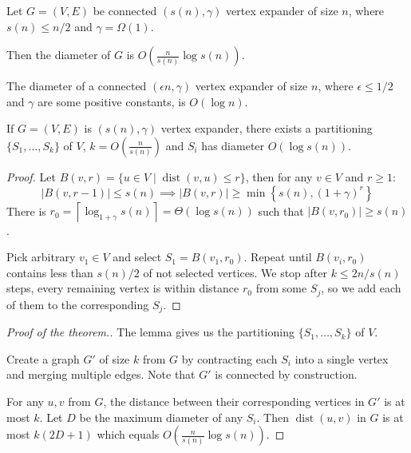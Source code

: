 \documentclass{beamer}
\newcommand{\ceil}[1]{{\left\lceil{#1}\right\rceil}}
\DeclareMathOperator*{\dist}{dist}
\newcommand{\autotitle}{\secname\ifdefempty{\subsecname}{}{~--- \subsecname}}
\newcommand{\smalldisplayskips}{
    \setlength{\abovedisplayskip}{3pt}
    \setlength{\belowdisplayskip}{3pt}}
\begin{document}
\begin{frame}{\autotitle}
    \begin{theorem}
        Let $G=(V,E)$ be connected $(s(n),\gamma)$ vertex expander of size $n$,
        where $s(n)\leq n/2$ and $\gamma=\Omega(1)$.
        
        Then the diameter of $G$ is $O\left(\frac{n}{s(n)}\log s(n)\right)$.
    \end{theorem}
    \begin{corollary}
        The diameter of a connected $(\epsilon n,\gamma)$ vertex expander of size $n$,
        where $\epsilon\leq1/2$ and $\gamma$ are some positive constants, is $O(\log n)$.
    \end{corollary}
\end{frame}

\begin{frame}{\autotitle}
    \small\smalldisplayskips
    \begin{lemma}
        If $G=(V,E)$ is $(s(n),\gamma)$ vertex expander,
        there exists a partitioning $\{S_1,\ldots,S_k\}$ of $V$,
        $k=O\left(\frac{n}{s(n)}\right)$ and $S_i$ has diameter $O(\log s(n))$.
    \end{lemma}

    \begin{proof}
        Let $B(v,r)=\{u\in V\;|\;\dist(v,u)\leq r\}$, then for any $v\in V$ and $r\geq 1$:
        \begin{equation*}
            |B(v,r-1)|\leq s(n)\implies
            |B(v,r)|\geq\min\left\{s(n),(1+\gamma)^r\right\}
        \end{equation*}
        There is $r_0=\ceil{\log_{1+\gamma}s(n)}=\Theta(\log s(n))$
        such that $|B(v,r_0)|\geq s(n)$.
        
        Pick arbitrary $v_1\in V$ and select $S_1=B(v_1,r_0)$.
        Repeat until $B(v_i,r_0)$ contains less than $s(n)/2$ of not selected vertices.
        We stop after $k\leq2n/s(n)$ steps, every remaining vertex
        is within distance $r_0$ from some $S_j$, 
        so we add each of them to the corresponding $S_j$.
    \end{proof}
\end{frame}

\begin{frame}{\autotitle}
    \begin{proof}[Proof of the theorem.]
        The lemma gives us the partitioning $\{S_1,\ldots,S_k\}$ of $V$.
        
        Create a graph $G'$ of size $k$ from $G$ by contracting each $S_i$
        into a single vertex and merging multiple edges.
        Note that $G'$ is connected by construction.
        
        For any $u,v$ from $G$, the distance between
        their corresponding vertices in $G'$ is at most $k$.
        Let $D$ be the maximum diameter of any $S_i$.
        Then $\dist(u,v)$ in $G$ is at most $k(2D+1)$
        which equals $O\left(\frac{n}{s(n)}\log s(n)\right)$.
    \end{proof}
\end{frame}
\end{document}
